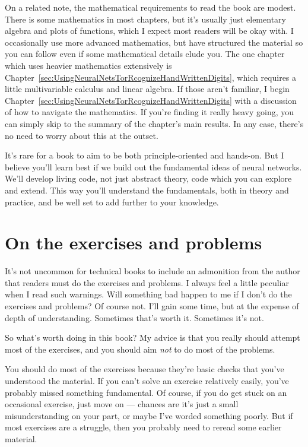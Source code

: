 On a related note, the mathematical requirements to read the book are modest. There is some mathematics in most chapters, but it's usually just elementary algebra and plots of functions, which I expect most readers will be okay with. I occasionally use more advanced mathematics, but have structured the material so you can follow even if some mathematical details elude you. The one chapter which uses heavier mathematics extensively is Chapter~\ref{sec:UsingNeuralNetsTorRcognizeHandWrittenDigits}, which requires a little multivariable calculus and linear algebra. If those aren't familiar, I begin Chapter~\ref{sec:UsingNeuralNetsTorRcognizeHandWrittenDigits} with a discussion of how to navigate the mathematics. If you're finding it really heavy going, you can simply skip to the summary of the chapter's main results. In any case, there's no need to worry about this at the outset.

It's rare for a book to aim to be both principle-oriented and hands-on. But I believe you'll learn best if we build out the fundamental ideas of neural networks. We'll develop living code, not just abstract theory, code which you can explore and extend. This way you'll understand the fundamentals, both in theory and practice, and be well set to add further to your knowledge.


\section*{On the exercises and problems}

It's not uncommon for technical books to include an admonition from the author that readers must do the exercises and problems. I always feel a little peculiar when I read such warnings. Will something bad happen to me if I don't do the exercises and problems? Of course not. I'll gain some time, but at the expense of depth of understanding. Sometimes that's worth it. Sometimes it's not.

So what's worth doing in this book? My advice is that you really should attempt most of the exercises, and you should aim \textit{not} to do most of the problems.

You should do most of the exercises because they're basic checks that you've understood the material. If you can't solve an exercise relatively easily, you've probably missed something fundamental. Of course, if you do get stuck on an occasional exercise, just move on --- chances are it's just a small misunderstanding on your part, or maybe I've worded something poorly. But if most exercises are a struggle, then you probably need to reread some earlier material.


